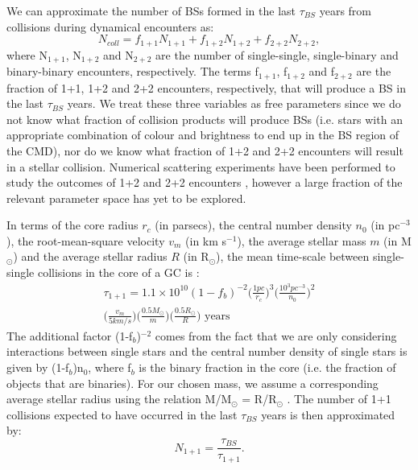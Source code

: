 We can approximate the number of BSs formed in the last $\tau_{BS}$
years from collisions during dynamical encounters as:  
\begin{equation}
\label{eqn:number-coll}
N_{coll} = f_{1+1}N_{1+1} + f_{1+2}N_{1+2} + f_{2+2}N_{2+2},
\end{equation}
where N$_{1+1}$, N$_{1+2}$ and N$_{2+2}$ are the number of
single-single, single-binary and binary-binary encounters,
respectively.  The terms f$_{1+1}$, f$_{1+2}$ and f$_{2+2}$ are the
fraction of 1+1, 1+2 and 2+2 encounters, respectively, that will
produce a BS in the last $\tau_{BS}$ years.  We treat these three
variables as free parameters since we do not know what fraction of
collision products will produce BSs (i.e. stars with an appropriate
combination of colour and brightness to end up in the BS region of the
CMD), nor do we know what fraction of 1+2 and 2+2 encounters will
result in a stellar collision.  Numerical scattering experiments have
been performed to study the outcomes of 1+2 and 2+2 encounters
\citep[e.g.][]{hut83, mcmillan86, fregeau04}, however a large fraction
of the relevant parameter space has yet to be explored.

In terms of the core radius $r_c$ (in parsecs), the central number
density $n_0$ (in pc$^{-3}$), the root-mean-square velocity $v_{m}$
(in km s$^{-1}$), the average stellar mass $m$ (in M$_{\odot}$) and
the average stellar radius $R$ (in R$_{\odot}$), the mean time-scale
between single-single collisions in the core of a GC is
\citep{leonard89}:
\begin{equation}
\begin{gathered}
\label{eqn:coll1+15}
\tau_{1+1} = 1.1 \times 10^{10}(1-f_b)^{-2} \Big(\frac{1 pc}{r_c}
\Big)^3 \Big(\frac{10^3 pc^{-3}}{n_0} \Big)^2 \\
 \Big(\frac{v_{m}}{5
  km/s} \Big) \Big(\frac{0.5 M_{\odot}}{m} \Big) \Big(\frac{0.5
  R_{\odot}}{R} \Big)\mbox{ years}
\end{gathered}
\end{equation}
The additional factor (1-f$_b$)$^{-2}$ comes from the fact that we
are only considering interactions between single stars and the
central number density of single stars is given by (1-f$_b$)n$_0$,
where f$_b$ is the binary fraction in the core (i.e. the fraction of
objects that are binaries).  For our chosen mass, we assume a
corresponding average stellar radius using the relation M/M$_{\odot}$
= R/R$_{\odot}$ \citep{iben91}.
The number of 1+1 collisions expected to have occurred in the last
$\tau_{BS}$ years is then approximated by:
\begin{equation}
\label{eqn:N-1+1}
N_{1+1} = \frac{\tau_{BS}}{\tau_{1+1}}.
\end{equation}

